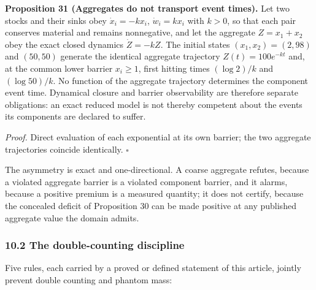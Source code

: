 \documentclass[11pt]{article}
\begin{document}
\textbf{Proposition 31 (Aggregates do not transport event times).} Let two stocks and their sinks obey
\(\dot x_i=-kx_i\), \(\dot w_i=kx_i\) with \(k>0\), so that each pair conserves material and remains
nonnegative, and let the aggregate \(Z=x_1+x_2\) obey the exact closed dynamics \(\dot Z=-kZ\). The
initial states \((x_1,x_2)=(2,98)\) and \((50,50)\) generate the identical aggregate trajectory
\(Z(t)=100e^{-kt}\) and, at the common lower barrier \(x_i\ge1\), first hitting times \((\log2)/k\)
and \((\log50)/k\). No function of the aggregate trajectory determines the component event time.
Dynamical closure and barrier observability are therefore separate obligations: an exact reduced
model is not thereby competent about the events its components are declared to suffer.

\emph{Proof.} Direct evaluation of each exponential at its own barrier; the two aggregate trajectories
coincide identically. \ensuremath{\square}

The asymmetry is exact and one-directional. A coarse aggregate refutes, because a violated aggregate
barrier is a violated component barrier, and it alarms, because a positive premium is a measured
quantity; it does not certify, because the concealed deficit of Proposition 30 can be made positive
at any published aggregate value the domain admits.


\subsubsection{10.2 The double-counting
discipline}\label{the-double-counting-discipline}

Five rules, each carried by a proved or defined statement of this
article, jointly prevent double counting and phantom mass:
\end{document}
